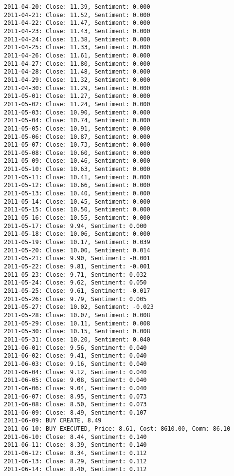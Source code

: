 \documentclass[11pt]{article}
\begin{document}
    \begin{Verbatim}[commandchars=\\\{\}]
2011-04-20: Close: 11.39, Sentiment: 0.000
2011-04-21: Close: 11.52, Sentiment: 0.000
2011-04-22: Close: 11.47, Sentiment: 0.000
2011-04-23: Close: 11.43, Sentiment: 0.000
2011-04-24: Close: 11.38, Sentiment: 0.000
2011-04-25: Close: 11.33, Sentiment: 0.000
2011-04-26: Close: 11.61, Sentiment: 0.000
2011-04-27: Close: 11.80, Sentiment: 0.000
2011-04-28: Close: 11.48, Sentiment: 0.000
2011-04-29: Close: 11.32, Sentiment: 0.000
2011-04-30: Close: 11.29, Sentiment: 0.000
2011-05-01: Close: 11.27, Sentiment: 0.000
2011-05-02: Close: 11.24, Sentiment: 0.000
2011-05-03: Close: 10.90, Sentiment: 0.000
2011-05-04: Close: 10.74, Sentiment: 0.000
2011-05-05: Close: 10.91, Sentiment: 0.000
2011-05-06: Close: 10.87, Sentiment: 0.000
2011-05-07: Close: 10.73, Sentiment: 0.000
2011-05-08: Close: 10.60, Sentiment: 0.000
2011-05-09: Close: 10.46, Sentiment: 0.000
2011-05-10: Close: 10.63, Sentiment: 0.000
2011-05-11: Close: 10.41, Sentiment: 0.000
2011-05-12: Close: 10.66, Sentiment: 0.000
2011-05-13: Close: 10.40, Sentiment: 0.000
2011-05-14: Close: 10.45, Sentiment: 0.000
2011-05-15: Close: 10.50, Sentiment: 0.000
2011-05-16: Close: 10.55, Sentiment: 0.000
2011-05-17: Close: 9.94, Sentiment: 0.000
2011-05-18: Close: 10.06, Sentiment: 0.000
2011-05-19: Close: 10.17, Sentiment: 0.039
2011-05-20: Close: 10.00, Sentiment: 0.014
2011-05-21: Close: 9.90, Sentiment: -0.001
2011-05-22: Close: 9.81, Sentiment: -0.001
2011-05-23: Close: 9.71, Sentiment: 0.032
2011-05-24: Close: 9.62, Sentiment: 0.050
2011-05-25: Close: 9.61, Sentiment: -0.017
2011-05-26: Close: 9.79, Sentiment: 0.005
2011-05-27: Close: 10.02, Sentiment: -0.023
2011-05-28: Close: 10.07, Sentiment: 0.008
2011-05-29: Close: 10.11, Sentiment: 0.008
2011-05-30: Close: 10.15, Sentiment: 0.008
2011-05-31: Close: 10.20, Sentiment: 0.040
2011-06-01: Close: 9.56, Sentiment: 0.040
2011-06-02: Close: 9.41, Sentiment: 0.040
2011-06-03: Close: 9.16, Sentiment: 0.040
2011-06-04: Close: 9.12, Sentiment: 0.040
2011-06-05: Close: 9.08, Sentiment: 0.040
2011-06-06: Close: 9.04, Sentiment: 0.040
2011-06-07: Close: 8.95, Sentiment: 0.073
2011-06-08: Close: 8.50, Sentiment: 0.073
2011-06-09: Close: 8.49, Sentiment: 0.107
2011-06-09: BUY CREATE, 8.49
2011-06-10: BUY EXECUTED, Price: 8.61, Cost: 8610.00, Comm: 86.10
2011-06-10: Close: 8.44, Sentiment: 0.140
2011-06-11: Close: 8.39, Sentiment: 0.140
2011-06-12: Close: 8.34, Sentiment: 0.112
2011-06-13: Close: 8.29, Sentiment: 0.112
2011-06-14: Close: 8.40, Sentiment: 0.112

\end{Verbatim}
\end{document}
